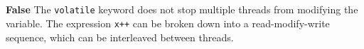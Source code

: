 \section{}
\textbf{False}
The \texttt{volatile} keyword does not stop multiple threads from modifying the variable.
The expression \texttt{x++} can be broken down into a read-modify-write sequence,
which can be interleaved between threads.